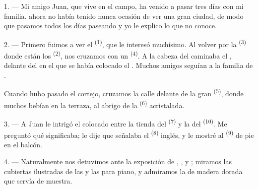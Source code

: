 
\VUsaut{4.0mm}
\VUsaut{3.0mm}

\VUsaut{3.0mm}

1. --- Mi amigo Juan, que vive en el campo, ha venido a pasar tres días
con mi familia.  ahora no había tenido nunca ocasión de ver
una gran ciudad, de modo que pasamos todos los días paseando y yo le
explico lo que no conoce.

2. --- Primero fuimos a ver el  \textsuperscript{(1)}, que le
interesó muchísimo. Al volver por la  \textsuperscript{(3)} donde están
los  \textsuperscript{(2)}, nos cruzamos con un
 \textsuperscript{(4)}. A la cabeza del 
caminaba el , delante del  en el que se
había colocado el . Muchos amigos seguían a la familia de
.

Cuando hubo pasado el cortejo, cruzamos la calle delante de la gran
 \textsuperscript{(5)}, donde muchos  bebían
 en la terraza, al abrigo de la 
\textsuperscript{(6)} acristalada.

3. --- A Juan le intrigó el  colocado entre la
tienda del  \textsuperscript{(7)} y la del
 \textsuperscript{(10)}. Me preguntó qué significaba; le
dije que señalaba el  \textsuperscript{(8)} inglés, y le mostré al
 \textsuperscript{(9)} de pie en el balcón.

\VUsaut{3.0mm}

4. --- Naturalmente nos detuvimos ante la exposición de
, ,  y
; miramos las cubiertas ilustradas de las 
y las  para piano, y admiramos la  de madera
dorada que servía de muestra.

